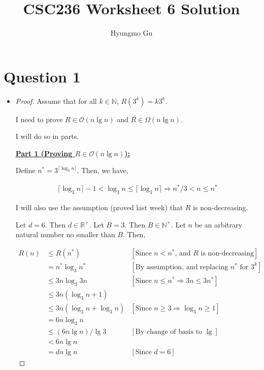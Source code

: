 \documentclass[12pt]{article}
\begin{document}
\title{CSC236 Worksheet 6 Solution}
\author{Hyungmo Gu}
\maketitle

\section*{Question 1}
\begin{itemize}
    \item

    \begin{proof}

    Assume that for all $k \in \mathbb{N}$, $R(3^k) = k3^k$.

    \bigskip

    I need to prove $R \in \mathcal{O}(n \lg n)$ and $R \in \Omega(n \lg n)$.

    \bigskip

    I will do so in parts.

    \bigskip

    \underline{\textbf{Part 1 (Proving $R \in \mathcal{O}(n \lg n)$):}}

    \bigskip

    Define $n^* = 3^{\lceil \log_3 n \rceil}$. Then, we have,

    \begin{align}
        \lceil \log_3 n \rceil - 1 < \log_3 n \leq \lceil \log_3 n \rceil \Rightarrow n^*/3 < n \leq n^*
    \end{align}

    I will also use the assumption (proved last week) that $R$ is non-decreasing.

    \bigskip

    Let $d = 6$. Then $d \in \mathbb{R}^+$. Let $B = 3$. Then $B \in \mathbb{N}^+$. Let
    $n$ be an arbitrary natural number no smaller than $B$. Then,

    \bigskip

    \begin{align}
    R(n) &\leq R(n^*)  & [\text{Since $n < n^*$, and $R$ is non-decreasing}]\\
    &= n^* \log_3 n^* & [\text{By assumption, and replacing $n^*$ for $3^k$}]\\
    &\leq 3n \log_3 3n  & [\text{Since $n \leq n^* \Rightarrow 3n \leq 3n^*$}]\\
    &\leq 3n(\log_3 n + 1)\\
    &\leq 3n(\log_3 n + \log_3 n) & [\text{Since $n \geq 3 \Rightarrow \log_3 n \geq 1$}]\\
    &= 6n \log_3 n\\
    &\leq (6n \lg n)/\lg 3 & [\text{By change of basis to $\lg$}]\\
    &< 6n \lg n\\
    &= dn \lg n & [\text{Since $d = 6$}]
    \end{align}


\end{proof}
\end{itemize}
\end{document}

